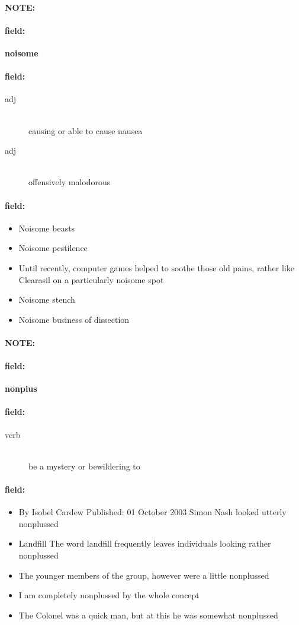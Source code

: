 \documentclass[12pt]{article}
\newenvironment{note}{\paragraph{NOTE:}}{}
\newenvironment{field}{\paragraph{field:}}{}
\begin{document}
\begin{note}
\begin{field}
\textbf{\large noisome}
\end{field}


\begin{field}
\begin{description}
\item[adj] \hfill \\ 
causing or able to cause nausea

\item[adj] \hfill \\ 
offensively malodorous

\end{description}
\end{field}

\begin{field}
\begin{itemize}
\item Noisome beasts
\item Noisome pestilence
\item Until recently, computer games helped to soothe those old pains, rather like Clearasil on a particularly noisome spot
\item Noisome stench
\item Noisome business of dissection
\end{itemize}
\end{field}
\end{note}
\begin{note}
\begin{field}
\textbf{\large nonplus}
\end{field}


\begin{field}
\begin{description}
\item[verb] \hfill \\ 
be a mystery or bewildering to

\end{description}
\end{field}

\begin{field}
\begin{itemize}
\item By Isobel Cardew Published: 01 October 2003 Simon Nash looked utterly nonplussed
\item Landfill The word landfill frequently leaves individuals looking rather nonplussed
\item The younger members of the group, however were a little nonplussed
\item  I am completely nonplussed by the whole concept
\item The Colonel was a quick man, but at this he was somewhat nonplussed
\end{itemize}
\end{field}
\end{note}
\end{document}
